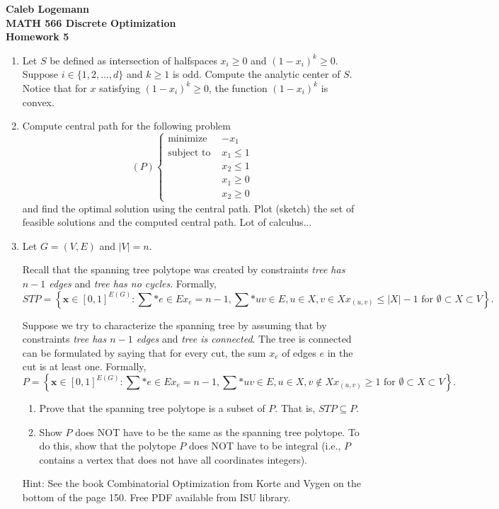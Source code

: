 \documentclass[11pt, oneside]{article}
\begin{document}
\noindent \textbf{\Large{Caleb Logemann \\
MATH 566 Discrete Optimization\\
Homework 5
}}

%
\begin{enumerate}
  \item %
    Let $S$ be defined as intersection of halfspaces $x_i \geq 0$ and $(1-x_i)^k \geq 0$.
    Suppose $i \in \{1,2,\ldots,d\}$ and $k \geq 1$ is odd.
    Compute the analytic center of $S$.
    Notice that for $x$ satisfying $(1-x_i)^k \geq 0$, the function $(1-x_i)^k$ is convex.

  \item %
    Compute central path for the following problem
    \[
      (P)
      \begin{cases} 
        \text{minimize }   & -x_1 \\
        \text{subject to } & x_1 \leq 1 \\
                           & x_2 \leq 1 \\
                           & x_1 \geq 0 \\
                           & x_2 \geq 0
      \end{cases}
    \]
    and find the optimal solution using the central path.
    Plot (sketch) the set of feasible solutions and the computed central path.
    Lot of calculus...

  \item %
    Let $G=(V,E)$ and $|V|=n$.

    Recall that the spanning tree polytope was created by constraints \emph{tree has $n-1$ edges}
    and \emph{tree has no cycles}. Formally,
    \[
      STP = 
      \left\{
        \textbf{x} \in [0,1]^{E(G)}: \sum*{e \in E}{}{x_e} = n-1, \sum*{uv \in E, u\in X, v \in X}{}{x_{(u,v)}} \leq |X|-1 \text{ for } \emptyset \subset X \subset V
      \right\}.
    \]


    Suppose we try to characterize the spanning tree by assuming that by 
    constraints \emph{tree has $n-1$ edges} and \emph{tree is connected}.
    The tree is connected can be formulated by saying that for every cut, the sum $x_e$ of edges $e$ in the cut is at least one. Formally,
    \[
      P = 
      \left\{
        \textbf{x} \in [0,1]^{E(G)}: \sum*{e \in E}{}{x_e} = n-1, \sum*{uv \in E, u\in X, v \not\in X}{}{x_{(u,v)}} \geq 1 \text{ for } \emptyset \subset X \subset V
      \right\}.
    \]
    \begin{enumerate}
      \item Prove that the spanning tree polytope is a subset of $P$. That is, $STP \subseteq P$.
      \item Show $P$ does NOT have to be the same as the spanning tree polytope. To do this, show that
        the polytope $P$ does NOT have to be integral (i.e., $P$ contains a vertex that does not have all coordinates integers).
    \end{enumerate}
    Hint: See the book Combinatorial Optimization from Korte and Vygen on the bottom of the page 150. Free PDF available from ISU library.


\end{enumerate}
\end{document}
